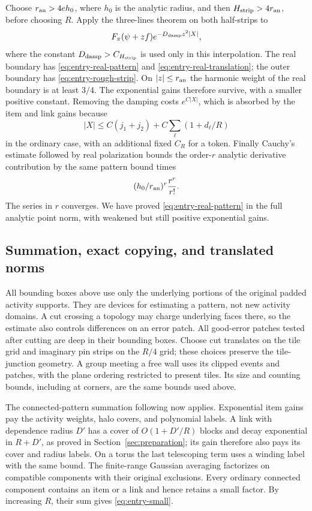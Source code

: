 Choose $r_{\rm an}>4eh_0$, where $h_0$ is the analytic radius, and then
$H_{\rm strip}>4r_{\rm an}$, before choosing $R$. Apply the three-lines
theorem on both half-strips to
\[
                  F_\pi(\psi+zf)e^{-D_{\rm damp}z^2|X|},
\]
where the constant $D_{\rm damp}>C_{H_{\rm strip}}$ is used only in this
interpolation. The real boundary has
\eqref{eq:entry-real-pattern} and
\eqref{eq:entry-real-translation}; the outer boundary has
\eqref{eq:entry-rough-strip}. On $|z|\le r_{\rm an}$ the harmonic weight
of the real boundary is at least $3/4$. The exponential gains
therefore survive, with a smaller positive constant. Removing the
damping costs $e^{C|X|}$, which is absorbed by the item and link
gains because
\[
              |X|\le C(j_1+j_2)
                    +C\sum_\ell(1+d_\ell/R)
\]
in the ordinary case, with an additional fixed $C_R$ for a token.
Finally Cauchy's estimate followed by real polarization bounds the
order-$r$ analytic derivative contribution by the same pattern
bound times
\[
                         (h_0/r_{\rm an})^r\frac{r^r}{r!}.
\]
The series in $r$ converges. We have proved
\eqref{eq:entry-real-pattern} in the full analytic point norm,
with weakened but still positive exponential gains.

\subsection{Summation, exact copying, and translated norms}

All bounding boxes above use only the underlying portions of the
original padded activity supports. They are devices for estimating
a pattern, not new activity domains. A cut crossing a topology
may charge underlying faces there, so the estimate also controls
differences on an error patch. All good-error patches tested after
cutting are deep in their bounding boxes. Choose cut translates
on the tile grid and imaginary pin strips on the $R/4$ grid;
these choices preserve the tile-junction geometry. A group meeting
a free wall uses its clipped events and patches, with the plane
ordering restricted to present tiles. Its size and counting bounds,
including at corners, are the same bounds used above.

The connected-pattern summation following
\cite[Equation (9.34)]{B} now applies. Exponential item gains pay
the activity weights, halo covers, and polynomial labels. A link
with dependence radius $D'$ has a cover of
$O(1+D'/R)$ blocks and decay exponential in $R+D'$, as proved in
Section~\ref{sec:preparation}; its gain therefore also pays its
cover and radius labels. On a torus the last telescoping term
uses a winding label with the same bound. The finite-range Gaussian
averaging factorizes on compatible components with their original
exclusions. Every ordinary connected component contains an item
or a link and hence retains a small factor. By increasing $R$,
their sum gives \eqref{eq:entry-small}.

